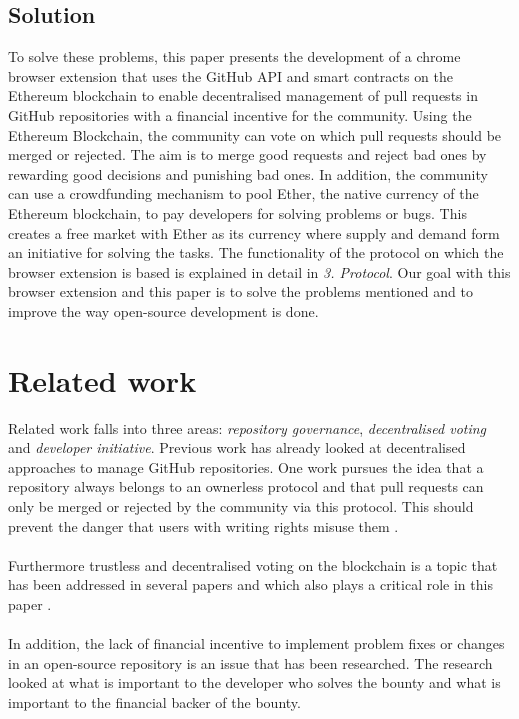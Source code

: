 \documentclass[sigconf]{acmart}
\begin{document}
\subsection{Solution}
To solve these problems, this paper presents the development of a chrome browser extension that uses the GitHub API  \cite{git2021api} and 
smart contracts \cite{eth2021contracts} on the Ethereum blockchain \cite{eth2021doc} to enable decentralised management of pull requests in GitHub repositories with a 
financial incentive for the community. Using the Ethereum Blockchain, the community can vote on which pull requests should be 
merged or rejected. The aim is to merge good requests and reject bad ones by rewarding good decisions and punishing bad ones. 
In addition, the community can 
use a crowdfunding mechanism to pool Ether, the native currency of the Ethereum blockchain, to pay developers for solving problems 
or bugs. This creates a free market with Ether as its currency where supply and demand form an initiative for solving the tasks. The functionality of the protocol on which the browser extension is based is explained in detail in \textit{3. Protocol}. Our goal with
 this browser extension and this paper is to solve the problems mentioned and to improve the way open-source development 
is done.

\section{Related work}
Related work falls into three areas: \textit{repository governance}, \textit{decentralised voting} and \textit{developer initiative}. 
Previous work has already looked at decentralised approaches to manage GitHub repositories. One work pursues the idea that 
a repository always belongs to an ownerless protocol and that pull requests can only be merged or rejected by the community 
via this protocol. This should prevent the danger that users with writing rights misuse them \cite{ulrich2020dev}. \\ \\
Furthermore trustless and decentralised voting on the blockchain is a topic that has been addressed in several papers 
and which also plays a critical role in this paper \cite{khoury2018decentralized, ulrich2020dev}. \\ \\
In addition, the lack of financial incentive to implement problem fixes or changes in an open-source repository is an issue that 
has been researched. The research looked at what is important to the developer who solves the bounty and what is 
important to the financial backer of 
the bounty. \cite{zhou2019bounties}
\end{document}

